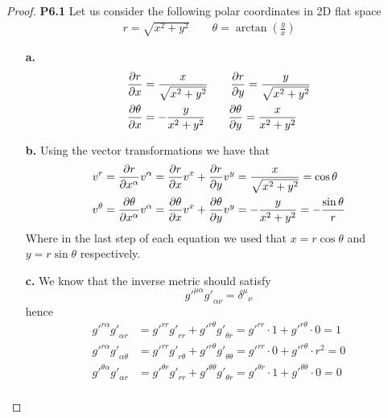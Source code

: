 \documentclass[11pt]{article}
\theoremstyle{definition}
\begin{document}
\begin{proof}{\textbf{P6.1}}
    Let us consider the following polar coordinates in 2D flat space
    \begin{align*}
        r = \sqrt{x^2 + y^2} \quad\quad \theta = \arctan(\frac{y}{x})
    \end{align*}
    \begin{itemize}
        \item [\textbf{a.}]
        \begin{align*}
            &\partialderivative{r}{x} = \frac{x}{\sqrt{x^2 + y^2}} \quad\quad
            \partialderivative{r}{y} = \frac{y}{\sqrt{x^2 + y^2}}\\
            &\partialderivative{\theta}{x} = -\frac{y}{x^2 + y^2} \quad\quad
            \partialderivative{\theta}{y} = \frac{x}{x^2 + y^2}
        \end{align*}
        \item [\textbf{b.}] Using the vector transformations we have that
        \begin{align*}
            v^r &= \partialderivative{r}{x^\alpha} v^\alpha
            = \partialderivative{r}{x} v^x + \partialderivative{r}{y} v^y
            = \frac{x}{\sqrt{x^2 + y^2}} = \cos\theta\\
            v^\theta &= \partialderivative{\theta}{x^\alpha} v^\alpha
            = \partialderivative{\theta}{x} v^x + \partialderivative{\theta}{y} v^y
            = -\frac{y}{x^2 + y^2} = -\frac{\sin\theta}{r}
        \end{align*}
        Where in the last step of each equation we used that $x = r\cos\theta$
        and $y = r\sin\theta$ respectively.
        \item [\textbf{c.}] We know that the inverse metric should satisfy
        $${g'}^{\mu\alpha}{g'}_{\alpha\nu} = {\delta^\mu}_\nu$$
        hence
        \begin{align*}
            {g'}^{r\alpha}{g'}_{\alpha r}
            &= {g'}^{rr}{g'}_{rr} + {g'}^{r\theta}{g'}_{\theta r}
            = {g'}^{rr}\cdot 1 + {g'}^{r\theta}\cdot 0 = 1\\
            {g'}^{r\alpha}{g'}_{\alpha \theta}
            &= {g'}^{rr}{g'}_{r\theta} + {g'}^{r\theta}{g'}_{\theta\theta}
            = {g'}^{rr}\cdot 0 + {g'}^{r\theta}\cdot r^2 = 0\\
            {g'}^{\theta\alpha}{g'}_{\alpha r}
            &= {g'}^{\theta r}{g'}_{rr} + {g'}^{\theta\theta}{g'}_{\theta r}
            = {g'}^{\theta r}\cdot 1 + {g'}^{\theta\theta}\cdot 0 = 0\\

\end{align*}
\end{itemize}
\end{proof}
\end{document}
